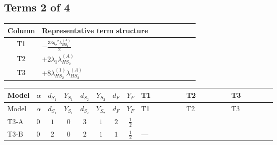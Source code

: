 \documentclass[8pt]{article}
\begin{document}
\begin{landscape}
\subsection*{Terms 2 of 4}
\begin{center}
\begin{tabular}{@{}c >{\raggedright\arraybackslash}p{0.82\linewidth}@{}}
\toprule
Column & Representative term structure \\
\midrule
T1 & \(\displaystyle -\frac{33 {g_2}^2 {\lambda_{HS_2}^{(A)}}}{2}\) \\
\midrule
T2 & \(\displaystyle +2 {\lambda_1} {\lambda_{HS_2}^{(A)}}\) \\
\midrule
T3 & \(\displaystyle +8 {\lambda_{HS_2}^{(1)}} {\lambda_{HS_2}^{(A)}}\) \\
\midrule
\bottomrule
\end{tabular}
\end{center}
\smallskip
\tiny
\begin{longtable}{@{}llcccccc >{\raggedright\arraybackslash}p{0.21\linewidth} >{\raggedright\arraybackslash}p{0.21\linewidth} >{\raggedright\arraybackslash}p{0.21\linewidth}@{}}
\toprule
Model & $\alpha$ & $d_{S_1}$ & $Y_{S_1}$ & $d_{S_2}$ & $Y_{S_2}$ & $d_F$ & $Y_F$ & T1 & T2 & T3 \\
\midrule
\endfirsthead
\toprule
Model & $\alpha$ & $d_{S_1}$ & $Y_{S_1}$ & $d_{S_2}$ & $Y_{S_2}$ & $d_F$ & $Y_F$ & T1 & T2 & T3 \\
\midrule
\endhead
T3-A & $0$ & $1$ & $0$ & $3$ & $1$ & $2$ & $\frac{1}{2}$ & \scriptsize\adjustbox{max width=\linewidth}{$\begin{gathered} -\frac{33 {g_2}^2 {\lambda_{HS_2}^{(A)}}}{2}\end{gathered}$} & \scriptsize\adjustbox{max width=\linewidth}{$\begin{gathered} +2 {\lambda_1} {\lambda_{HS_2}^{(A)}}\end{gathered}$} & \scriptsize\adjustbox{max width=\linewidth}{$\begin{gathered} +8 {\lambda_{HS_2}^{(1)}} {\lambda_{HS_2}^{(A)}}\end{gathered}$} \\
\midrule
T3-B & $0$ & $2$ & $0$ & $2$ & $1$ & $1$ & $\frac{1}{2}$ & --- & \scriptsize\adjustbox{max width=\linewidth}{$\begin{gathered} +2 {\lambda_1} {\lambda_{HS_2}^{(A)}}\end{gathered}$} & \scriptsize\adjustbox{max width=\linewidth}{$\begin{gathered} +8 {\lambda_{HS_2}^{(1)}} {\lambda_{HS_2}^{(A)}}\end{gathered}$} \\

\end{longtable}
\end{landscape}
\end{document}
